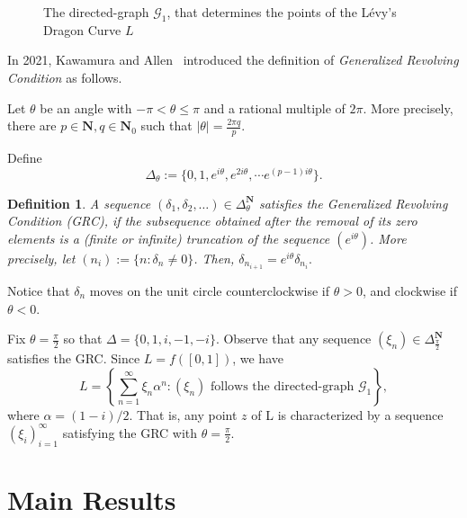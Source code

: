 \documentclass[epsf,10pt]{article}
\newcommand\GG{\mathcal{G}}
\newcommand\NN{\mathbf{N}}
\newtheorem{definition}[theorem]{Definition}
\begin{document}
\begin{figure}[H]
  	\begin{center}
	\end{center}
    \caption{The directed-graph $\GG_1$, that determines the points of the L\'evy's Dragon Curve $L$}
\label{fig:map1}
\end{figure}

\bigskip

In 2021, Kawamura and Allen~\cite{Kawamura-Allen-2021} introduced the definition of \textit{Generalized Revolving Condition} as follows.

Let $\theta$ be an angle with $-\pi < \theta \leq \pi$ and a rational multiple of $2 \pi$. More precisely, there are $p \in \NN, q \in \NN_{0}$ such that $|\theta|=\frac{2 \pi q}{p}$. 

Define 
$$\Delta_{\theta}:= \{0, 1, e^{i \theta}, e^{2i \theta}, \cdots e^{(p-1)i \theta}\}.$$

\begin{definition}
A sequence $(\delta_{1},\delta_{2},\dots)\in\Delta_{\theta}^{\NN}$ satisfies the {\em Generalized Revolving Condition (GRC)}, if the  subsequence obtained after the removal of its zero elements is a (finite or infinite) truncation of the sequence $(e^{i \theta})$. More precisely, let $(n_i):=\{n:\delta_n \neq 0\}$. Then, 
$\delta_{n_{i+1}}=e^{i \theta} \delta_{n_i}.$
\end{definition}


Notice that $\delta_n$ moves on the unit circle counterclockwise if $\theta >0$, and clockwise if $\theta < 0$. 
\bigskip

Fix $\theta = \frac{\pi}{2}$ so that $\Delta= \{0,1,i,-1,-i\}$.
Observe that any sequence $(\xi_n)\in \Delta^{\NN}_{\frac{\pi}{2}}$ satisfies the GRC. Since $L=f([0,1])$, we have 
\begin{equation} 
    \label{L-revolving}
  L=\left\{ \sum_{n=1}^{\infty} \xi_{n}\alpha^{n}: (\xi_n) \mbox{ follows the directed-graph $\GG_1$} \right\}, 
\end{equation}
where $\alpha=(1-i)/2.$ That is, any point $z$ of L is characterized by a sequence $(\xi_i)_{i=1}^{\infty} $ satisfying the GRC with $\theta=\frac{\pi}{2}$.

\section{Main Results}
\end{document}
